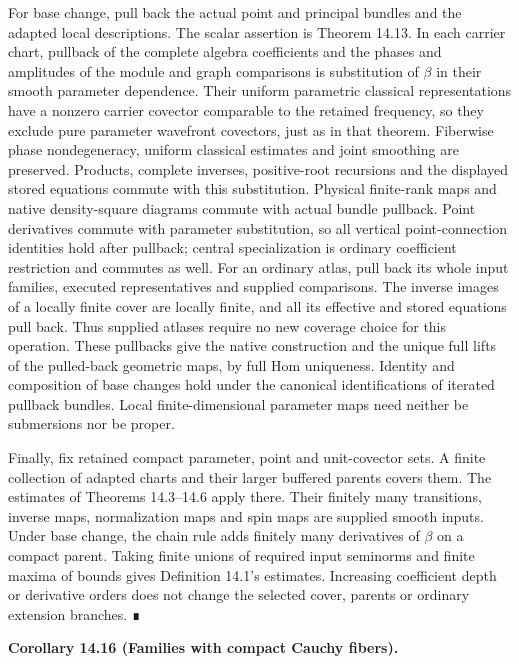 \documentclass[
  english,
  11pt,
  reqno]{amsart}
\makeatletter
\newcommand{\pandocstatementheading}[1]{%
  \par\addpenalty{\@beginparpenalty}%
  \addvspace{.5\baselineskip plus .2\baselineskip minus .2\baselineskip}%
  {\normalfont\bfseries #1\par}%
  \nobreak\@afterindenttrue\@afterheading
}
\makeatother
\begin{document}
For base change, pull back the actual point and principal bundles and
the adapted local descriptions. The scalar assertion is Theorem 14.13.
In each carrier chart, pullback of the complete algebra coefficients and
the phases and amplitudes of the module and graph comparisons is
substitution of \(\beta\) in their smooth parameter dependence. Their
uniform parametric classical representations have a nonzero carrier
covector comparable to the retained frequency, so they exclude pure
parameter wavefront covectors, just as in that theorem. Fiberwise phase
nondegeneracy, uniform classical estimates and joint smoothing are
preserved. Products, complete inverses, positive-root recursions and the
displayed stored equations commute with this substitution. Physical
finite-rank maps and native density-square diagrams commute with actual
bundle pullback. Point derivatives commute with parameter substitution,
so all vertical point-connection identities hold after pullback; central
specialization is ordinary coefficient restriction and commutes as well.
For an ordinary atlas, pull back its whole input families, executed
representatives and supplied comparisons. The inverse images of a
locally finite cover are locally finite, and all its effective and
stored equations pull back. Thus supplied atlases require no new
coverage choice for this operation. These pullbacks give the native
construction and the unique full lifts of the pulled-back geometric
maps, by full Hom uniqueness. Identity and composition of base changes
hold under the canonical identifications of iterated pullback bundles.
Local finite-dimensional parameter maps need neither be submersions nor
be proper.

Finally, fix retained compact parameter, point and unit-covector sets. A
finite collection of adapted charts and their larger buffered parents
covers them. The estimates of Theorems 14.3--14.6 apply there. Their
finitely many transitions, inverse maps, normalization maps and spin
maps are supplied smooth inputs. Under base change, the chain rule adds
finitely many derivatives of \(\beta\) on a compact parent. Taking
finite unions of required input seminorms and finite maxima of bounds
gives Definition 14.1's estimates. Increasing coefficient depth or
derivative orders does not change the selected cover, parents or
ordinary extension branches. ∎

\pandocstatementheading{\protect{}\label{cor:compact-cauchy-bundle-correspondence}Corollary 14.16 (Families with compact Cauchy fibers).}
\end{document}
